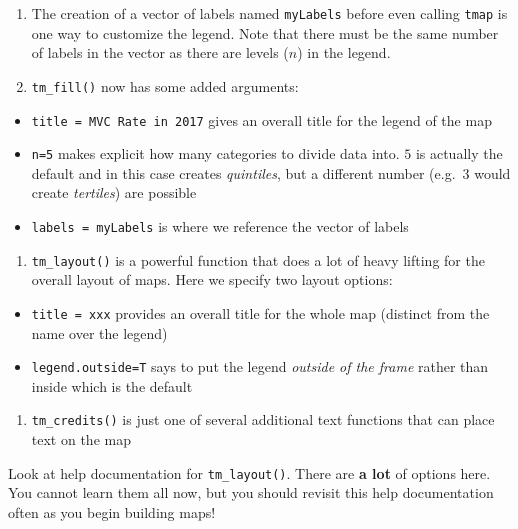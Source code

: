 \documentclass[
]{book}
\providecommand{\tightlist}{%
  \setlength{\itemsep}{0pt}\setlength{\parskip}{0pt}}
\newenvironment{rmdnote}[1]
  {
  \begin{itemize}
  \renewcommand{\labelitemi}{
    \raisebox{-.7\height}[0pt][0pt]{
      {\setkeys{Gin}{width=3em,keepaspectratio}\texttt{[image: images/\#1]}}
    }
  }
  \setlength{\fboxsep}{1em}
  \begin{note}
  \item
  }
  {
  \end{note}
  \end{itemize}
  }
\begin{document}
\begin{enumerate}
\def\labelenumi{\arabic{enumi}.}
\tightlist
\item
  The creation of a vector of labels named \texttt{myLabels} before even calling \texttt{tmap} is one way to customize the legend. Note that there must be the same number of labels in the vector as there are levels (\(n\)) in the legend.
\item
  \texttt{tm\_fill()} now has some added arguments:
\end{enumerate}

\begin{itemize}
\tightlist
\item
  \texttt{title\ =\ \textquotesingle{}MVC\ Rate\ in\ 2017\textquotesingle{}} gives an overall title for the legend of the map
\item
  \texttt{n=5} makes explicit how many categories to divide data into. \(5\) is actually the default and in this case creates \emph{quintiles}, but a different number (e.g.~\(3\) would create \emph{tertiles}) are possible
\item
  \texttt{labels\ =\ myLabels} is where we reference the vector of labels
\end{itemize}

\begin{enumerate}
\def\labelenumi{\arabic{enumi}.}
\setcounter{enumi}{2}
\tightlist
\item
  \texttt{tm\_layout()} is a powerful function that does a lot of heavy lifting for the overall layout of maps. Here we specify two layout options:
\end{enumerate}

\begin{itemize}
\tightlist
\item
  \texttt{title\ =\ xxx} provides an overall title for the whole map (distinct from the name over the legend)
\item
  \texttt{legend.outside=T} says to put the legend \emph{outside of the frame} rather than inside which is the default
\end{itemize}

\begin{enumerate}
\def\labelenumi{\arabic{enumi}.}
\setcounter{enumi}{3}
\tightlist
\item
  \texttt{tm\_credits()} is just one of several additional text functions that can place text on the map
\end{enumerate}

\begin{rmdnote}{note}
Look at help documentation for \texttt{tm\_layout()}. There are \textbf{a lot} of options here. You cannot learn them all now, but you should revisit this help documentation often as you begin building maps!

\end{rmdnote}
\end{document}
